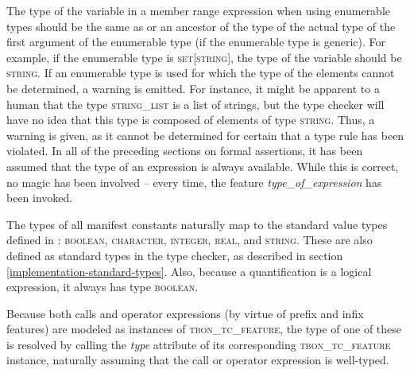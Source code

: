The type of the variable in a member range expression when using enumerable types should be the same as or an ancestor of the type of the actual type of the first argument of the enumerable type (if the enumerable type is generic). For example, if the enumerable type is \textsc{set}[\textsc{string}], the type of the variable should be \textsc{string}. If an enumerable type is used for which the type of the elements cannot be determined, a warning is emitted. For instance, it might be apparent to a human that the type \textsc{string\_list} is a list of strings, but the type checker will have no idea that this type is composed of elements of type \textsc{string}. Thus, a warning is given, as it cannot be determined for certain that a type rule has been violated.
In all of the preceding sections on formal assertions, it has been assumed that the type of an expression is always available. While this is correct, no magic has been involved -- every time, the feature \textit{type\_of\_expression} has been invoked.

The types of all manifest constants naturally map to the standard value types defined in \bon{} \cite[p.~51]{walden1995}: \textsc{boolean}, \textsc{character}, \textsc{integer}, \textsc{real}, and \textsc{string}. These are also defined as standard types in the type checker, as described in section \ref{implementation-standard-types}. Also, because a quantification is a logical expression, it always has type \textsc{boolean}.

Because both calls and operator expressions (by virtue of prefix and infix features) are modeled as instances of \textsc{tbon\_tc\_feature}, the type of one of these is resolved by calling the \textit{type} attribute of its corresponding \textsc{tbon\_tc\_feature} instance, naturally assuming that the call or operator expression is well-typed.

